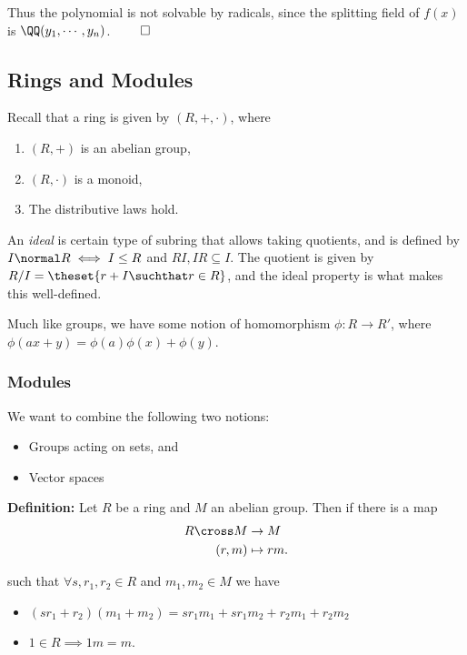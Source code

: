 Thus the polynomial is not solvable by radicals, since the splitting
field of \(f(x)\) is \(\QQ(y_1, \cdots, y_n)\). \(\qed\)

\hypertarget{rings-and-modules}{%
\subsection{Rings and Modules}\label{rings-and-modules}}

Recall that a ring is given by \((R, +, \cdot)\), where

\begin{enumerate}
\def\labelenumi{\arabic{enumi}.}
\tightlist
\item
  \((R, +)\) is an abelian group,
\item
  \((R, \cdot)\) is a monoid,
\item
  The distributive laws hold.
\end{enumerate}

An \emph{ideal} is certain type of subring that allows taking quotients,
and is defined by \(I \normal R \iff I\leq R\) and
\(RI, IR \subseteq I\). The quotient is given by
\(R/I = \theset{r + I \suchthat r\in R}\), and the ideal property is
what makes this well-defined.

Much like groups, we have some notion of homomorphism \(\phi: R\to R'\),
where \(\phi(ax+y) = \phi(a)\phi(x) + \phi(y)\).

\hypertarget{modules}{%
\subsubsection{Modules}\label{modules}}

We want to combine the following two notions:

\begin{itemize}
\item
  Groups acting on sets, and
\item
  Vector spaces
\end{itemize}

\textbf{Definition:} Let \(R\) be a ring and \(M\) an abelian group.
Then if there is a map \begin{align*}
R\cross M &\to M \\
(r,m) &\mapsto rm
.\end{align*}

such that \(\forall s,r_1,r_2 \in R\) and \(m_1,m_2 \in M\) we have

\begin{itemize}
\tightlist
\item
  \((sr_1 + r_2)(m_1 + m_2) = sr_1m_1 + sr_1m_2 + r_2m_1 + r_2 m_2\)
\item
  \(1\in R \implies 1m = m\).
\end{itemize}

